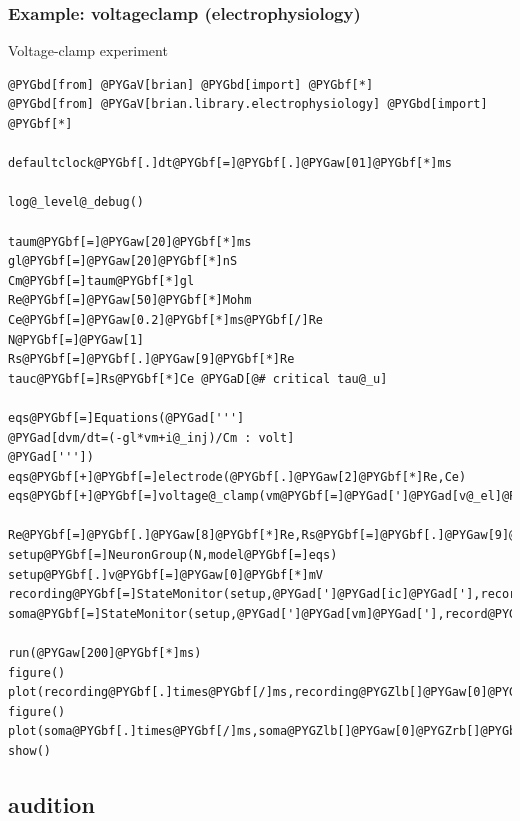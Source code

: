 \documentclass[letterpaper,10pt,english]{manual}
\begin{document}
\hypertarget{index-39}{}\subsubsection{Example: voltageclamp (electrophysiology)}

Voltage-clamp experiment

\begin{Verbatim}[commandchars=@\[\]]
@PYGbd[from] @PYGaV[brian] @PYGbd[import] @PYGbf[*]
@PYGbd[from] @PYGaV[brian.library.electrophysiology] @PYGbd[import] @PYGbf[*]

defaultclock@PYGbf[.]dt@PYGbf[=]@PYGbf[.]@PYGaw[01]@PYGbf[*]ms

log@_level@_debug()

taum@PYGbf[=]@PYGaw[20]@PYGbf[*]ms
gl@PYGbf[=]@PYGaw[20]@PYGbf[*]nS
Cm@PYGbf[=]taum@PYGbf[*]gl
Re@PYGbf[=]@PYGaw[50]@PYGbf[*]Mohm
Ce@PYGbf[=]@PYGaw[0.2]@PYGbf[*]ms@PYGbf[/]Re
N@PYGbf[=]@PYGaw[1]
Rs@PYGbf[=]@PYGbf[.]@PYGaw[9]@PYGbf[*]Re
tauc@PYGbf[=]Rs@PYGbf[*]Ce @PYGaD[@# critical tau@_u]

eqs@PYGbf[=]Equations(@PYGad[''']
@PYGad[dvm/dt=(-gl*vm+i@_inj)/Cm : volt]
@PYGad['''])
eqs@PYGbf[+]@PYGbf[=]electrode(@PYGbf[.]@PYGaw[2]@PYGbf[*]Re,Ce)
eqs@PYGbf[+]@PYGbf[=]voltage@_clamp(vm@PYGbf[=]@PYGad[']@PYGad[v@_el]@PYGad['],v@_cmd@PYGbf[=]@PYGaw[20]@PYGbf[*]mV,i@_inj@PYGbf[=]@PYGad[']@PYGad[i@_cmd]@PYGad['],i@_rec@PYGbf[=]@PYGad[']@PYGad[ic]@PYGad['],
                   Re@PYGbf[=]@PYGbf[.]@PYGaw[8]@PYGbf[*]Re,Rs@PYGbf[=]@PYGbf[.]@PYGaw[9]@PYGbf[*]Re,tau@_u@PYGbf[=]@PYGbf[.]@PYGaw[2]@PYGbf[*]ms)
setup@PYGbf[=]NeuronGroup(N,model@PYGbf[=]eqs)
setup@PYGbf[.]v@PYGbf[=]@PYGaw[0]@PYGbf[*]mV
recording@PYGbf[=]StateMonitor(setup,@PYGad[']@PYGad[ic]@PYGad['],record@PYGbf[=]@PYGaA[True])
soma@PYGbf[=]StateMonitor(setup,@PYGad[']@PYGad[vm]@PYGad['],record@PYGbf[=]@PYGaA[True])

run(@PYGaw[200]@PYGbf[*]ms)
figure()
plot(recording@PYGbf[.]times@PYGbf[/]ms,recording@PYGZlb[]@PYGaw[0]@PYGZrb[]@PYGbf[/]nA,@PYGad[']@PYGad[k]@PYGad['])
figure()
plot(soma@PYGbf[.]times@PYGbf[/]ms,soma@PYGZlb[]@PYGaw[0]@PYGZrb[]@PYGbf[/]mV,@PYGad[']@PYGad[b]@PYGad['])
show()
\end{Verbatim}


\subsection{audition}

\resetcurrentobjects
\hypertarget{--doc-examples-audition_filterbank}{}
\end{document}
